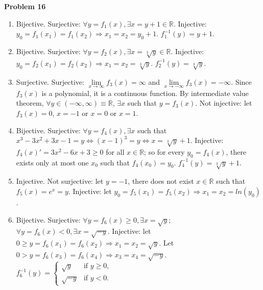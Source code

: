 \documentclass{article}
\begin{document}
\textbf{Problem 16}
\begin{enumerate}[label={(\roman*)}]
    \item Bijective. Surjective: $\forall y=f_1(x), \exists x = y +1\in \mathbb{R}$. Injective: $y_0=f_1(x_1)=f_1(x_2)\Rightarrow x_1=x_2=y_0+1$. $f_1^{-1}(y)=y+1$.
    \item Bijective. Surjective: $\forall y=f_2(x), \exists x = \sqrt[3]{y}\in \mathbb{R}$. Injective: $y_0=f_2(x_1)=f_2(x_2)\Rightarrow x_1=x_2=\sqrt[3]{y}$. $f_2^{-1}(y)=\sqrt[3]{y}$.
    \item Surjective. Surjective: $\lim\limits_{x\rightarrow \infty}f_3(x)=\infty$ and $\lim\limits_{x\rightarrow -\infty}f_3(x)=-\infty$. Since $f_3(x)$ is a polynomial, it is a continuous function. By intermediate value theorem, $\forall y  \in (-\infty,\infty)\equiv \mathbb{R}$, $\exists x$ such that $y=f_3(x)$. Not injective: let $f_3(x)=0$, $x=-1$ or $x=0$ or $x=1$. 
    \item Bijective. Surjective: $\forall y=f_4(x), \exists x$ such that $x^3-3x^2+3x-1=y \Leftrightarrow (x-1)^3=y \Leftrightarrow x=\sqrt[3]{y}+1$. Injective: $f_4(x)'=3x^2-6x+3\ge 0$ for all $x\in \mathbb{R}$; so for every $y_0=f_4(x)$, there exists only at most one $x_0$ such that $f_4(x_0)=y_0$. $f_4^{-1}(y)=\sqrt[3]{y}+1$. 
    \item Injective. Not surjective: let $y=-1$, there does not exist $x\in \mathbb{R}$ such that $f_5(x)=e^x=y$. Injective: let $y_0=f_5(x_1)=f_5(x_2)\Rightarrow x_1=x_2=ln(y_0)$.
    \item Bijective. Surjective: $\forall y = f_6(x) \ge 0, \exists x=\sqrt{y}$; $\forall y=f_6(x)<0,\exists x=\sqrt{-y}$. Injective: let $0\ge y=f_6(x_1)=f_6(x_2)\Rightarrow x_1=x_2=\sqrt{y}$. Let $0>y=f_6(x_3)=f_6(x_4)\Rightarrow x_3=x_4=\sqrt{-y}$. $f_6^{-1}(y)=\begin{cases}
        \sqrt{y} & \text{if }y\ge 0,\\
        \sqrt{-y} & \text{if }y<0.
    \end{cases}$
\end{enumerate}
\end{document}
